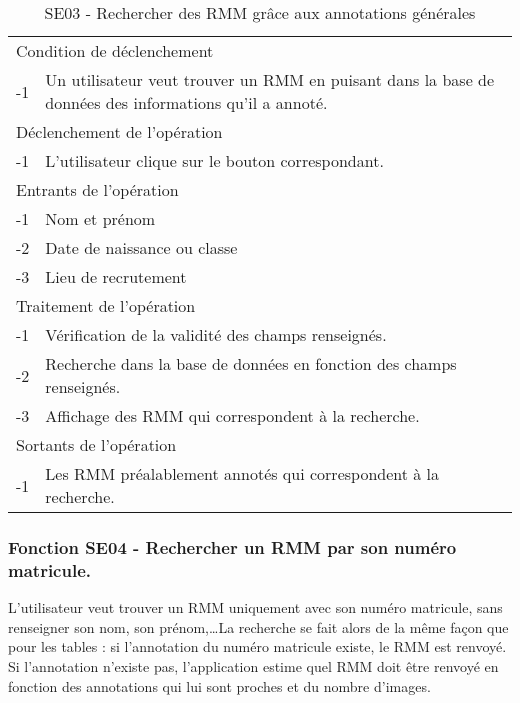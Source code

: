 \documentclass[a4paper]{article}
\begin{document}
\begin{table}[H]
  \centering
   \small
	\begin{tabular}{|c|p{12cm}|}
   		\hline
   			\rowcolor{lightgray}\multicolumn{2}{|c|}{\textbf{SE03 - Rechercher des RMM grâce aux annotations personnelles}} \\
   		\hline
   			\multicolumn{2}{|l|}{Condition de d\'eclenchement} \\
   		\hline
   			-1 & Un utilisateur veut trouver un RMM en puisant dans la base de données des informations qu'il a annoté. \\
   		\hline
   			\multicolumn{2}{|l|}{D\'eclenchement de l'op\'eration} \\
   		\hline
   			-1 & L'utilisateur clique sur le bouton correspondant. \\
   		\hline
   			\multicolumn{2}{|l|}{Entrants de l'op\'eration} \\
   		\hline
   			-1 & Nom et prénom \\
        	-2 & Date de naissance ou classe \\ 
        	-3 & Lieu de recrutement \\ 
   		\hline
   			\multicolumn{2}{|l|}{Traitement de l'op\'eration} \\
  		\hline
  			-1 & Vérification de la validité des champs renseignés. \\
   			-2 & Recherche dans la base de données en fonction des champs renseignés. \\
        	-3 & Affichage des RMM qui correspondent à la recherche. \\
   		\hline
   			\multicolumn{2}{|l|}{Sortants de l'op\'eration} \\
   		\hline
   			-1 & Les RMM préalablement annotés qui correspondent à la recherche. \\
   		\hline
	\end{tabular}
  \caption{SE03 - Rechercher des RMM grâce aux annotations générales}
  \normalsize
  \label{tab:SE03}
\end{table}

\subsubsection{Fonction SE04 - Rechercher un RMM par son numéro matricule.}

L'utilisateur veut trouver un RMM uniquement avec son numéro matricule, sans renseigner son nom, son prénom,\ldots La recherche se fait alors de la même façon que pour les tables : si l'annotation du numéro matricule existe, le RMM est renvoyé. Si l'annotation n'existe pas, l'application estime quel RMM doit être renvoyé en fonction des annotations qui lui sont proches et du nombre d'images.
\\
\end{document}
